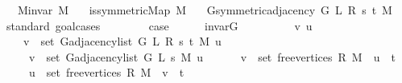 \begin{isabellebody}
\ \ \ {\isachardoublequoteopen}M{\isachardot}{\kern0pt}invar\ M{\isachardoublequoteclose}\isanewline
\ \ \ {\isachardoublequoteopen}is{\isacharunderscore}{\kern0pt}symmetric{\isacharunderscore}{\kern0pt}Map\ M{\isachardoublequoteclose}\isanewline
\ \ \ {\isachardoublequoteopen}G{\isachardot}{\kern0pt}symmetric{\isacharunderscore}{\kern0pt}adjacency{\isacharprime}{\kern0pt}\ {\isacharparenleft}{\kern0pt}G{}{\isacharunderscore}{\kern0pt}{}\ L\ R\ s\ t\ M{\isacharparenright}{\kern0pt}{\isachardoublequoteclose}%
\endisataginvisible
{\isafoldinvisible}%
%
\isadeliminvisible
\isanewline
%
\endisadeliminvisible
%
\isadelimproof
%
\endisadelimproof
%
\isatagproof
{}\isamarkupfalse%
\ {\isacharparenleft}{\kern0pt}standard{\isacharcomma}{\kern0pt}\ goal{\isacharunderscore}{\kern0pt}cases{\isacharparenright}{\kern0pt}\isanewline
\ \ \isamarkupfalse%
\ {}\isanewline
\ \ \isamarkupfalse%
\ {\isacharquery}{\kern0pt}case\isanewline
\ \ \ \ \isamarkupfalse%
\ invar{\isacharunderscore}{\kern0pt}G{}{\isacharunderscore}{\kern0pt}{}\isanewline
\ \ \ \ \isacommand{{\isachardot}{\kern0pt}}\isamarkupfalse%
\isanewline
{}\isamarkupfalse%
\isanewline
\ \ \isamarkupfalse%
\ {\isacharparenleft}{\kern0pt}{}\ v\ u{\isacharparenright}{\kern0pt}\isanewline
\ \ \isamarkupfalse%
\isanewline
\ \ \ \ {\isachardoublequoteopen}v\ {\isasymin}\ set\ {\isacharparenleft}{\kern0pt}G{\isachardot}{\kern0pt}adjacency{\isacharunderscore}{\kern0pt}list\ {\isacharparenleft}{\kern0pt}G{}{\isacharunderscore}{\kern0pt}{}\ L\ R\ s\ t\ M{\isacharparenright}{\kern0pt}\ u{\isacharparenright}{\kern0pt}\ {\isasymlongleftrightarrow}\isanewline
\ \ \ \ \ v\ {\isasymin}\ set\ {\isacharparenleft}{\kern0pt}G{\isachardot}{\kern0pt}adjacency{\isacharunderscore}{\kern0pt}list\ {\isacharparenleft}{\kern0pt}G{}{\isacharunderscore}{\kern0pt}{}\ L\ s\ M{\isacharparenright}{\kern0pt}\ u{\isacharparenright}{\kern0pt}\ {\isasymor}\isanewline
\ \ \ \ \ {\isacharparenleft}{\kern0pt}v\ {\isasymin}\ set\ {\isacharparenleft}{\kern0pt}free{\isacharunderscore}{\kern0pt}vertices\ R\ M{\isacharparenright}{\kern0pt}\ {\isasymand}\ u\ {\isacharequal}{\kern0pt}\ t{\isacharparenright}{\kern0pt}\ {\isasymor}\isanewline
\ \ \ \ \ {\isacharparenleft}{\kern0pt}u\ {\isasymin}\ set\ {\isacharparenleft}{\kern0pt}free{\isacharunderscore}{\kern0pt}vertices\ R\ M{\isacharparenright}{\kern0pt}\ {\isasymand}\ v\ {\isacharequal}{\kern0pt}\ t{\isacharparenright}{\kern0pt}{\isachardoublequoteclose}\isanewline

\end{isabellebody}
